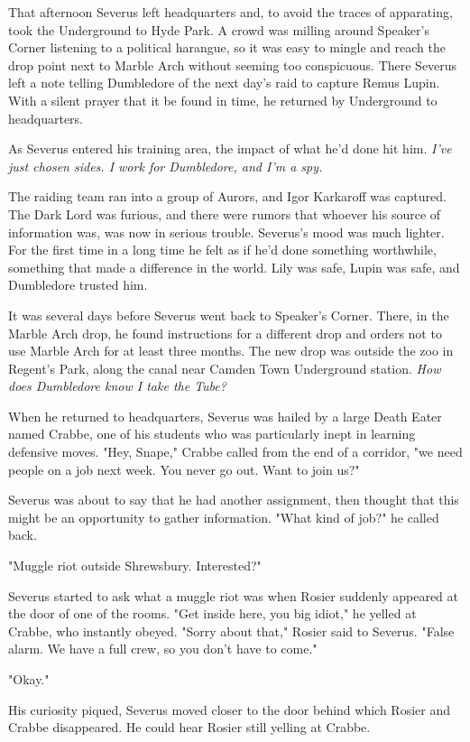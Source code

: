 \documentclass[a4paper,11pt]{article}
\begin{document}
That afternoon Severus left headquarters and, to avoid the traces of apparating, took the Underground to Hyde Park. A crowd was milling around Speaker's Corner listening to a political harangue, so it was easy to mingle and reach the drop point next to Marble Arch without seeming too conspicuous. There Severus left a note telling Dumbledore of the next day's raid to capture Remus Lupin. With a silent prayer that it be found in time, he returned by Underground to headquarters.

As Severus entered his training area, the impact of what he'd done hit him. \emph{I've just chosen sides. I work for Dumbledore, and I'm a spy.}

The raiding team ran into a group of Aurors, and Igor Karkaroff was captured. The Dark Lord was furious, and there were rumors that whoever his source of information was, was now in serious trouble. Severus's mood was much lighter. For the first time in a long time he felt as if he'd done something worthwhile, something that made a difference in the world. Lily was safe, Lupin was safe, and Dumbledore trusted him.

It was several days before Severus went back to Speaker's Corner. There, in the Marble Arch drop, he found instructions for a different drop and orders not to use Marble Arch for at least three months. The new drop was outside the zoo in Regent's Park, along the canal near Camden Town Underground station. \emph{How does Dumbledore know I take the Tube?}

When he returned to headquarters, Severus was hailed by a large Death Eater named Crabbe, one of his students who was particularly inept in learning defensive moves. "Hey, Snape," Crabbe called from the end of a corridor, "we need people on a job next week. You never go out. Want to join us?"

Severus was about to say that he had another assignment, then thought that this might be an opportunity to gather information. "What kind of job?" he called back.

"Muggle riot outside Shrewsbury. Interested?"

Severus started to ask what a muggle riot was when Rosier suddenly appeared at the door of one of the rooms. "Get inside here, you big idiot," he yelled at Crabbe, who instantly obeyed. "Sorry about that," Rosier said to Severus. "False alarm. We have a full crew, so you don't have to come."

"Okay."

His curiosity piqued, Severus moved closer to the door behind which Rosier and Crabbe disappeared. He could hear Rosier still yelling at Crabbe.
\end{document}
